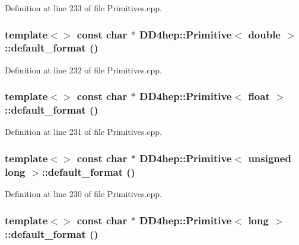 Definition at line 233 of file Primitives.cpp.\hypertarget{struct_d_d4hep_1_1_primitive_a7b261a0502c9f17fd5180f118958c814}{
\subsubsection[{default\_\-format}]{\setlength{\rightskip}{0pt plus 5cm}template$<$$>$ const char $\ast$ {\bf DD4hep::Primitive}$<$ double $>$::default\_\-format ()}}
\label{struct_d_d4hep_1_1_primitive_a7b261a0502c9f17fd5180f118958c814}


Definition at line 232 of file Primitives.cpp.\hypertarget{struct_d_d4hep_1_1_primitive_a72abbbbcfae0f99bd5456794293b2696}{
\subsubsection[{default\_\-format}]{\setlength{\rightskip}{0pt plus 5cm}template$<$$>$ const char $\ast$ {\bf DD4hep::Primitive}$<$ float $>$::default\_\-format ()}}
\label{struct_d_d4hep_1_1_primitive_a72abbbbcfae0f99bd5456794293b2696}


Definition at line 231 of file Primitives.cpp.\hypertarget{struct_d_d4hep_1_1_primitive_a866210de66db8555ea809ff0d39eb957}{
\subsubsection[{default\_\-format}]{\setlength{\rightskip}{0pt plus 5cm}template$<$$>$ const char $\ast$ {\bf DD4hep::Primitive}$<$ unsigned long $>$::default\_\-format ()}}
\label{struct_d_d4hep_1_1_primitive_a866210de66db8555ea809ff0d39eb957}


Definition at line 230 of file Primitives.cpp.\hypertarget{struct_d_d4hep_1_1_primitive_a496cc6580fe5688d8e013291003745cf}{
\subsubsection[{default\_\-format}]{\setlength{\rightskip}{0pt plus 5cm}template$<$$>$ const char $\ast$ {\bf DD4hep::Primitive}$<$ long $>$::default\_\-format ()}}
\label{struct_d_d4hep_1_1_primitive_a496cc6580fe5688d8e013291003745cf}


